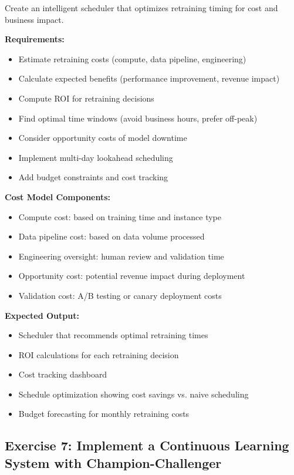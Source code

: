 Create an intelligent scheduler that optimizes retraining timing for cost and business impact.

\textbf{Requirements:}
\begin{itemize}
    \item Estimate retraining costs (compute, data pipeline, engineering)
    \item Calculate expected benefits (performance improvement, revenue impact)
    \item Compute ROI for retraining decisions
    \item Find optimal time windows (avoid business hours, prefer off-peak)
    \item Consider opportunity costs of model downtime
    \item Implement multi-day lookahead scheduling
    \item Add budget constraints and cost tracking
\end{itemize}

\textbf{Cost Model Components:}
\begin{itemize}
    \item Compute cost: based on training time and instance type
    \item Data pipeline cost: based on data volume processed
    \item Engineering oversight: human review and validation time
    \item Opportunity cost: potential revenue impact during deployment
    \item Validation cost: A/B testing or canary deployment costs
\end{itemize}

\textbf{Expected Output:}
\begin{itemize}
    \item Scheduler that recommends optimal retraining times
    \item ROI calculations for each retraining decision
    \item Cost tracking dashboard
    \item Schedule optimization showing cost savings vs. naive scheduling
    \item Budget forecasting for monthly retraining costs
\end{itemize}

\subsection{Exercise 7: Implement a Continuous Learning System with Champion-Challenger}

